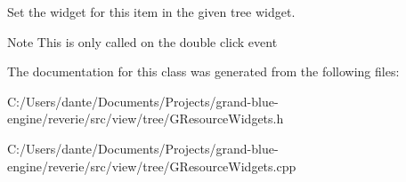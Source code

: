 Set the widget for this item in the given tree widget. 

\begin{DoxyNote}{Note}
This is only called on the double click event 
\end{DoxyNote}


The documentation for this class was generated from the following files\+:\begin{DoxyCompactItemize}
\item 
C\+:/\+Users/dante/\+Documents/\+Projects/grand-\/blue-\/engine/reverie/src/view/tree/G\+Resource\+Widgets.\+h\item 
C\+:/\+Users/dante/\+Documents/\+Projects/grand-\/blue-\/engine/reverie/src/view/tree/G\+Resource\+Widgets.\+cpp\end{DoxyCompactItemize}
